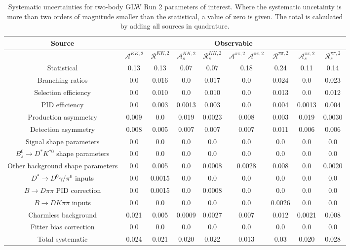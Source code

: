 \begin{sidewaystable}
  \centering
  \begin{tabular}{ccccccccc}
      \toprule
      Source & \multicolumn{8}{c}{Observable} \\
      \midrule
       & $\mathcal{A}^{KK,2}$ & $\mathcal{R}^{KK,2}$ & $\mathcal{A}_s^{KK,2}$ & $\mathcal{R}_{s}^{KK,2}$ & $\mathcal{A}^{\pi\pi,2}$
$\mathcal{A}^{\pi\pi,2}$ & $\mathcal{R}^{\pi\pi,2}$ & $\mathcal{A}_s^{\pi\pi,2}$ & $\mathcal{R}_{s}^{\pi\pi,2}$ \\
      \midrule
      Statistical & 0.13 & 0.13 & 0.07 & 0.07 & 0.18 & 0.24 & 0.11 & 0.14 \\
      \midrule
      Branching ratios & 0.0  & 0.016 & 0.0  & 0.017 & 0.0  & 0.024 & 0.0  & 0.023 \\
      Selection efficiency & 0.0  & 0.010 & 0.0  & 0.010 & 0.0  & 0.013 & 0.0  & 0.012 \\
      PID efficiency & 0.0  & 0.003 & 0.0013 & 0.003 & 0.0  & 0.004 & 0.0013 & 0.004 \\
      Production asymmetry & 0.009 & 0.0  & 0.019 & 0.0023 & 0.008 & 0.003 & 0.019 & 0.0030 \\
      Detection asymmetry & 0.008 & 0.005 & 0.007 & 0.007 & 0.007 & 0.011 & 0.006 & 0.006 \\
      Signal shape parameters & 0.0  & 0.0  & 0.0  & 0.0  & 0.0  & 0.0  & 0.0  & 0.0  \\
      $B^0_s \to D^* K^{*0}$ shape parameters & 0.0  & 0.0  & 0.0  & 0.0  & 0.0  & 0.0  & 0.0  & 0.0  \\
      Other background shape parameters & 0.0  & 0.005 & 0.0  & 0.0008 & 0.0028 & 0.008 & 0.0  & 0.0020 \\
      $D^* \to D^0 \gamma/\pi^0$ inputs & 0.0  & 0.0015 & 0.0  & 0.0  & 0.0  & 0.0  & 0.0  & 0.0  \\
      $B\to D\pi\pi$ PID correction & 0.0  & 0.0015 & 0.0  & 0.0008 & 0.0  & 0.0  & 0.0  & 0.0  \\
      $B\to DK\pi\pi$ inputs & 0.0  & 0.0  & 0.0  & 0.0  & 0.0  & 0.0026 & 0.0  & 0.0  \\
      Charmless background & 0.021 & 0.005 & 0.0009 & 0.0027 & 0.007 & 0.012 & 0.0021 & 0.008 \\
      Fitter bias correction & 0.0  & 0.0  & 0.0  & 0.0  & 0.0  & 0.0  & 0.0  & 0.0  \\
      \midrule
      Total systematic & 0.024 & 0.021 & 0.020 & 0.022 & 0.013 & 0.03 & 0.020 & 0.028 \\
      \bottomrule
  \end{tabular}
  \caption{Systematic uncertainties for two-body GLW Run 2 parameters of interest. Where the systematic uncetainty is more than two orders of magnitude smaller than the statistical, a value of zero is given. The total is calculated by adding all sources in quadrature.}
\label{tab:twoBody_GLW_run2_systematics}
\end{sidewaystable}
